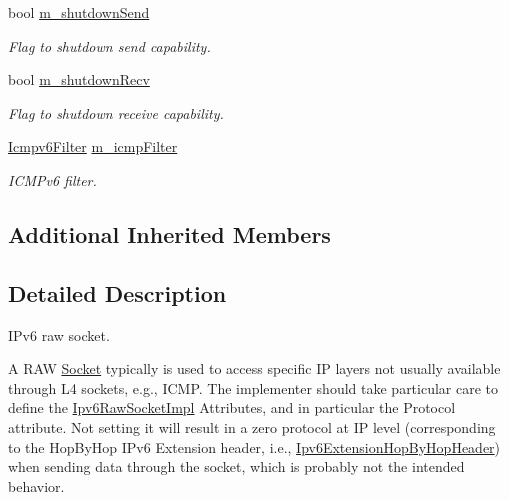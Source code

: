 \begin{DoxyCompactItemize}
bool \hyperlink{classns3_1_1Ipv6RawSocketImpl_a974dfa7bfc98a6c070d74b42dbc1cb30}{m\+\_\+shutdown\+Send}
\begin{DoxyCompactList}\small\item\em Flag to shutdown send capability. \end{DoxyCompactList}\item 
bool \hyperlink{classns3_1_1Ipv6RawSocketImpl_a6db5d278326c66329425f615ccdf63ec}{m\+\_\+shutdown\+Recv}
\begin{DoxyCompactList}\small\item\em Flag to shutdown receive capability. \end{DoxyCompactList}\item 
\hyperlink{structns3_1_1Ipv6RawSocketImpl_1_1Icmpv6Filter}{Icmpv6\+Filter} \hyperlink{classns3_1_1Ipv6RawSocketImpl_a38df054d5b81d3d1d29543fff42f44bb}{m\+\_\+icmp\+Filter}
\begin{DoxyCompactList}\small\item\em I\+C\+M\+Pv6 filter. \end{DoxyCompactList}\end{DoxyCompactItemize}
\subsection*{Additional Inherited Members}


\subsection{Detailed Description}
I\+Pv6 raw socket. 

A R\+AW \hyperlink{classns3_1_1Socket}{Socket} typically is used to access specific IP layers not usually available through L4 sockets, e.\+g., I\+C\+MP. The implementer should take particular care to define the \hyperlink{classns3_1_1Ipv6RawSocketImpl}{Ipv6\+Raw\+Socket\+Impl} Attributes, and in particular the Protocol attribute. Not setting it will result in a zero protocol at IP level (corresponding to the Hop\+By\+Hop I\+Pv6 Extension header, i.\+e., \hyperlink{classns3_1_1Ipv6ExtensionHopByHopHeader}{Ipv6\+Extension\+Hop\+By\+Hop\+Header}) when sending data through the socket, which is probably not the intended behavior.

